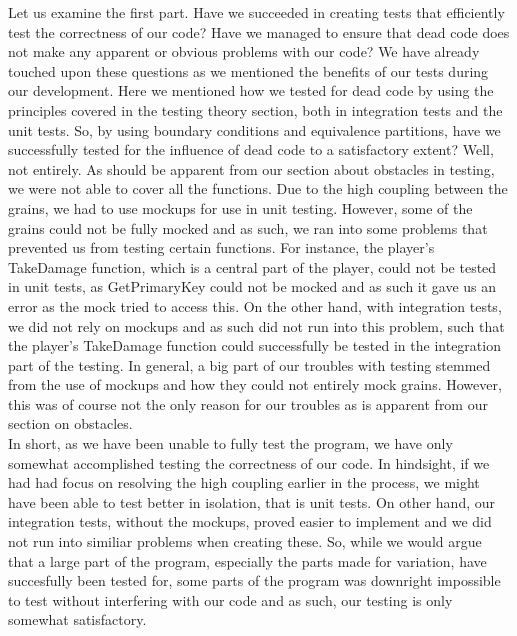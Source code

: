 Let us examine the first part. Have we succeeded in creating tests that efficiently test the correctness of our code? Have we managed to ensure that dead code does not make any apparent or obvious problems with our code? We have already touched upon these questions as we mentioned the benefits of our tests during our development. Here we mentioned how we tested for dead code by using the principles covered in the testing theory section, both in integration tests and the unit tests. So, by using boundary conditions and equivalence partitions, have we successfully tested for the influence of dead code to a satisfactory extent? Well, not entirely. As should be apparent from our section about obstacles in testing, we were not able to cover all the functions. Due to the high coupling between the grains, we had to use mockups for use in unit testing. However, some of the grains could not be fully mocked and as such, we ran into some problems that prevented us from testing certain functions. For instance, the player's TakeDamage function, which is a central part of the player, could not be tested in unit tests, as GetPrimaryKey could not be mocked and as such it gave us an error as the mock tried to access this. On the other hand, with integration tests, we did not rely on mockups and as such did not run into this problem, such that the player's TakeDamage function could successfully be tested in the integration part of the testing. In general, a big part of our troubles with testing stemmed from the use of mockups and how they could not entirely mock grains. However, this was of course not the only reason for our troubles as is apparent from our section on obstacles. \\
In short, as we have been unable to fully test the program, we have only somewhat accomplished testing the correctness of our code. In hindsight, if we had had focus on resolving the high coupling earlier in the process, we might have been able to test better in isolation, that is unit tests. On other hand, our integration tests, without the mockups, proved easier to implement and we did not run into similiar problems when creating these. So, while we would argue that a large part of the program, especially the parts made for variation, have succesfully been tested for, some parts of the program was downright impossible to test without interfering with our code and as such, our testing is only somewhat satisfactory. \\
\\

